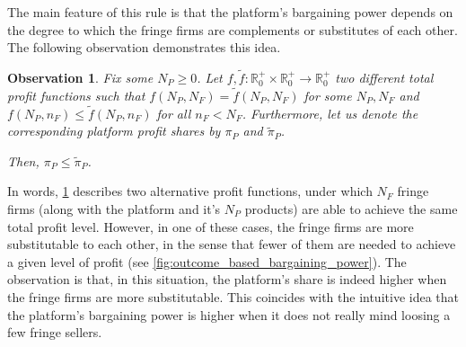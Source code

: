 \documentclass[a4paper]{article}
\newtheorem{observation}{Observation}
\begin{document}
The main feature of this rule is that the platform's bargaining power depends on the degree to which the fringe firms are complements or substitutes of each other.
The following observation demonstrates this idea.
\begin{observation}
    \label{prop:outcome_based_bargaining_power}
    Fix some $N_P \geq 0$. Let $f, \tilde{f}: \mathbb{R}^+_0 \times \mathbb{R}^+_0 \to \mathbb{R}^+_0$ two different total profit functions such that $f(N_P, N_F) = \tilde{f}(N_P, N_F)$ for some $N_P, N_F$ and $f(N_P, n_F) \leq \tilde{f}(N_P, n_F)$ for all $n_F < N_F$.
    Furthermore, let us denote the corresponding platform profit shares by $\pi_P$ and $\tilde{\pi}_P$.
    
    Then, $\pi_P \leq \tilde{\pi}_P$.
\end{observation}

In words, \cref{prop:outcome_based_bargaining_power} describes two alternative profit functions, under which $N_F$ fringe firms (along with the platform and it's $N_P$ products) are able to achieve the same total profit level.
However, in one of these cases, the fringe firms are more substitutable to each other, in the sense that fewer of them are needed to achieve a given level of profit (see \cref{fig:outcome_based_bargaining_power}).
The observation is that, in this situation, the platform's share is indeed higher when the fringe firms are more substitutable.
This coincides with the intuitive idea that the platform's bargaining power is higher when it does not really mind loosing a few fringe sellers.
\end{document}
